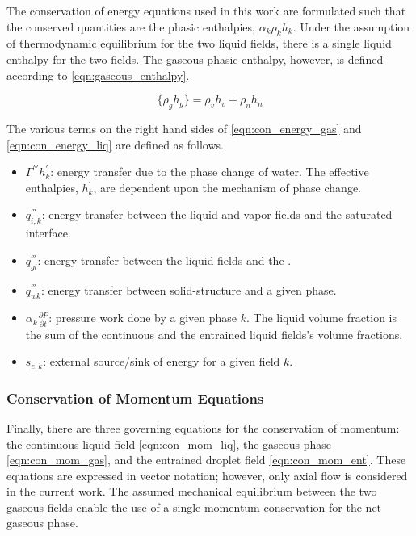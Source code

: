 The conservation of energy equations used in this work are formulated such that the conserved quantities are the phasic enthalpies, $\alpha_k \rho_k h_k$.
Under the assumption of thermodynamic equilibrium for the two liquid fields, there is a single liquid enthalpy for the two fields.
The gaseous phasic enthalpy, however, is defined according to \eqref{eqn:gaseous_enthalpy}.

\begin{equation}
\label{eqn:gaseous_enthalpy}
\{\rho_g h_g\} = \rho_v h_v + \rho_n h_n
\end{equation}

The various terms on the right hand sides of \eqref{eqn:con_energy_gas} and \eqref{eqn:con_energy_liq} are defined as follows.
\begin{itemize}
\item{
$\Gamma^{'''} h^{'}_k$:
 energy transfer due to the phase change of water.
 The effective enthalpies, $h^{'}_k$, are dependent upon the mechanism of phase change.
}
\item{
$q^{'''}_{i,k}$:
energy transfer between the liquid and vapor fields and the saturated interface.
}
\item{
$q^{'''}_{gl}$:
energy transfer between the liquid fields and the \ncgs{}.
}
\item{
$q^{'''}_{wk}$:
 energy transfer between solid-structure and a given phase.
}
\item{
$\alpha_k \frac{\partial P}{\partial t}$:
 pressure work done by a given phase $k$.
 The liquid volume fraction is the sum of the continuous and the entrained liquid fields's volume fractions.
}
\item{
$s_{e,k}$:
 external source/sink of energy for a given field $k$.
}
\end{itemize}

\subsubsection{Conservation of Momentum Equations}
\label{subsubsect:momentum_equations}

Finally, there are three governing equations for the conservation of momentum: the continuous liquid field \eqref{eqn:con_mom_liq}, the gaseous phase \eqref{eqn:con_mom_gas}, and the entrained droplet field \eqref{eqn:con_mom_ent}.
These equations are expressed in vector notation; however, only axial flow is considered in the current work.
The assumed mechanical equilibrium between the two gaseous fields enable the use of a single momentum conservation for the net gaseous phase.

